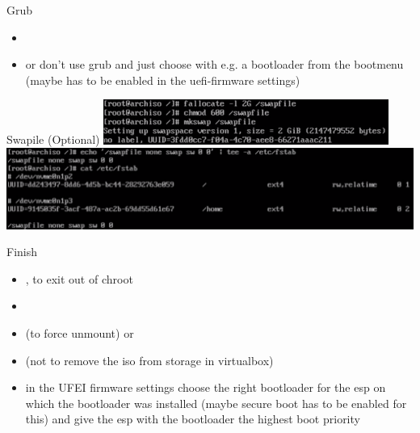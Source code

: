 \begin{frame}{Grub}
\begin{itemize}
\begin{itemize}
      \end{itemize}
    \item {}
  \end{itemize}
  \begin{Sidenote}
    \begin{itemize}
      \scriptsize
      \item or don't use grub and just choose with e.g.  a bootloader from the bootmenu (maybe has to be enabled in the uefi-firmware settings)
    \end{itemize}
  \end{Sidenote}
\end{frame}

\begin{frame}{Swapile (Optional)}
  \includegraphics[width=0.7\textwidth]{./figures/swapfile.png}
  \includegraphics[width=\textwidth]{./figures/swapfile2.png}
\end{frame}

\begin{frame}[fragile]{Finish}
  \begin{itemize}
    \item {}, to exit out of chroot
    \item {}
      \item {} (to force unmount) or 
    \item {} (not  to remove the iso from storage in virtualbox)
    \item in the UFEI firmware settings   choose the right bootloader for the esp on which the bootloader was installed (maybe secure boot has to be enabled for this) and give the esp with the bootloader the highest boot priority
  \end{itemize}
\end{frame}
